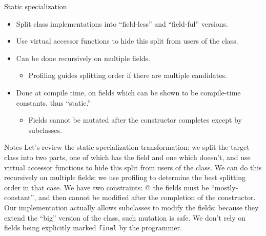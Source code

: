 \documentclass[%
pdf,
colorBG,
slideColor,
nototal,
oqe
]{prosper}
\renewcommand{\yellow}{\colC}
\newenvironment{talknotes}{\begin{slide}{Notes}\tiny}{\end{slide}}
\begin{document}
\begin{slide}{Static specialization}
\begin{itemize}
\item Split class implementations into ``field-less'' and
  ``field-ful'' versions.
\item Use virtual accessor functions to hide this split from users of
  the class.
\item Can be done recursively on multiple fields.
\begin{itemize}
\item Profiling guides splitting order if there are multiple candidates.
\end{itemize}
\item Done at compile time, on fields which can be shown to be
  compile-time constants, thus ``static.''
\begin{itemize}
\item Fields cannot be mutated after the constructor completes
\yellow except by subclasses.
\end{itemize}
\end{itemize}
\end{slide}

\begin{talknotes}
Let's review the static specialization transformation:  we split the
target class into two parts, one of which has the field and one which
doesn't, and use virtual accessor functions to hide this split from
users of the class.  
We can do this recursively on multiple fields; we use profiling to
determine the best splitting order in that case.
We have two constraints: @ the fields must be
``mostly-constant'', and then cannot be modified after the completion
of the constructor.
Our implementation actually allows subclasses to modify the fields;
because they extend the ``big'' version of the class, such mutation is
safe.  We don't rely on fields being explicitly marked {\tt final} by
the programmer.
\end{talknotes}

\end{document}
